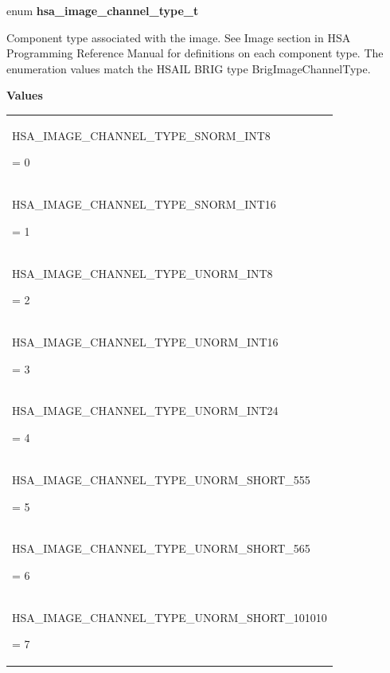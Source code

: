 \documentclass[final]{book}
\newcommand{\reftyp}[1]{#1}
\newcommand{\refenu}[1]{\reftyp{#1}}
\begin{document}
\begin{appendices}
\noindent\begin{tcolorbox}[nobeforeafter,arc=0mm,colframe=white,colback=lightgray,left=0mm]
enum \hypertarget{group--images-1ga7d3e7d97190287ab62c7f4fd8c64198b}{\textbf{hsa_image_channel_type_t}}
\end{tcolorbox}
Component type associated with the image. See Image section in HSA Programming Reference Manual for definitions on each component type. The enumeration values match the HSAIL BRIG type BrigImageChannelType.

\noindent\textbf{Values}\\[-5mm]
\begin{longtable}{@{\hspace{2em}}p{\linewidth-2em}}
\hspace{-2em}\hypertarget{group--images-1gga7d3e7d97190287ab62c7f4fd8c64198baa994fc79285f41b189294c84e13f2bf4}{\refenu{HSA_IMAGE_CHANNEL_TYPE_SNORM_INT8}} = 0\\[2mm]
\hspace{-2em}\hypertarget{group--images-1gga7d3e7d97190287ab62c7f4fd8c64198ba3110ecdc68f698b211bd05919e31240c}{\refenu{HSA_IMAGE_CHANNEL_TYPE_SNORM_INT16}} = 1\\[2mm]
\hspace{-2em}\hypertarget{group--images-1gga7d3e7d97190287ab62c7f4fd8c64198ba4c1b25efb6f85fb8905f0517fd352fb7}{\refenu{HSA_IMAGE_CHANNEL_TYPE_UNORM_INT8}} = 2\\[2mm]
\hspace{-2em}\hypertarget{group--images-1gga7d3e7d97190287ab62c7f4fd8c64198bae6d404a874f7c0d45c770c4c76fcc81a}{\refenu{HSA_IMAGE_CHANNEL_TYPE_UNORM_INT16}} = 3\\[2mm]
\hspace{-2em}\hypertarget{group--images-1gga7d3e7d97190287ab62c7f4fd8c64198ba18bd89b3fa2d12de710151d5a1156989}{\refenu{HSA_IMAGE_CHANNEL_TYPE_UNORM_INT24}} = 4\\[2mm]
\hspace{-2em}\hypertarget{group--images-1gga7d3e7d97190287ab62c7f4fd8c64198baa9a977cb029a005ecfe04478615d88a5}{\refenu{HSA_IMAGE_CHANNEL_TYPE_UNORM_SHORT_555}} = 5\\[2mm]
\hspace{-2em}\hypertarget{group--images-1gga7d3e7d97190287ab62c7f4fd8c64198bab9868c05cc0271f59a41bc7752ad014c}{\refenu{HSA_IMAGE_CHANNEL_TYPE_UNORM_SHORT_565}} = 6\\[2mm]
\hspace{-2em}\hypertarget{group--images-1gga7d3e7d97190287ab62c7f4fd8c64198ba3d4c3799b293c3a2dd4ffdda42123644}{\refenu{HSA_IMAGE_CHANNEL_TYPE_UNORM_SHORT_101010}} = 7\\[2mm]

\end{longtable}
\end{appendices}
\end{document}
